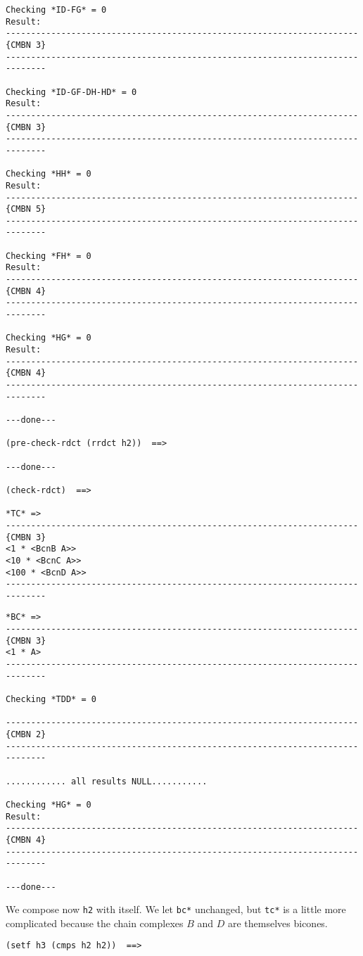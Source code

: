 {{\begin{verbatim}
Checking *ID-FG* = 0
Result: 
----------------------------------------------------------------------{CMBN 3}
------------------------------------------------------------------------------

Checking *ID-GF-DH-HD* = 0
Result: 
----------------------------------------------------------------------{CMBN 3}
------------------------------------------------------------------------------

Checking *HH* = 0
Result: 
----------------------------------------------------------------------{CMBN 5}
------------------------------------------------------------------------------

Checking *FH* = 0
Result: 
----------------------------------------------------------------------{CMBN 4}
------------------------------------------------------------------------------

Checking *HG* = 0
Result: 
----------------------------------------------------------------------{CMBN 4}
------------------------------------------------------------------------------

---done---

(pre-check-rdct (rrdct h2))  ==>

---done---

(check-rdct)  ==>

*TC* => 
----------------------------------------------------------------------{CMBN 3}
<1 * <BcnB A>>
<10 * <BcnC A>>
<100 * <BcnD A>>
------------------------------------------------------------------------------
\end{verbatim}}
\newpage
{\footnotesize \begin{verbatim}
*BC* => 
----------------------------------------------------------------------{CMBN 3}
<1 * A>
------------------------------------------------------------------------------

Checking *TDD* = 0

----------------------------------------------------------------------{CMBN 2}
------------------------------------------------------------------------------

............ all results NULL........... 

Checking *HG* = 0
Result: 
----------------------------------------------------------------------{CMBN 4}
------------------------------------------------------------------------------

---done---
\end{verbatim}}
We compose now {\tt h2} with itself. We let {\tt *bc*} unchanged, but {\tt *tc*}
is a little more complicated because the chain complexes $B$ and $D$  are themselves  bicones.
{\footnotesize\begin{verbatim}
(setf h3 (cmps h2 h2))  ==>


\end{verbatim}}}
